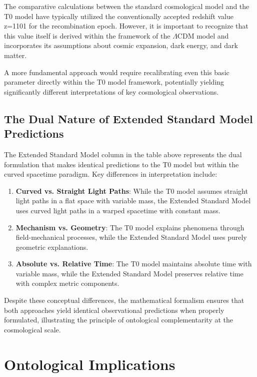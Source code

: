 \documentclass[12pt,a4paper]{article}
\begin{document}
	The comparative calculations between the standard cosmological model and the T0 model have typically utilized the conventionally accepted redshift value z=1101 for the recombination epoch. However, it is important to recognize that this value itself is derived within the framework of the $\Lambda$CDM model and incorporates its assumptions about cosmic expansion, dark energy, and dark matter.
	
	A more fundamental approach would require recalibrating even this basic parameter directly within the T0 model framework, potentially yielding significantly different interpretations of key cosmological observations.
	
	\subsection{The Dual Nature of Extended Standard Model Predictions}
	
	The Extended Standard Model column in the table above represents the dual formulation that makes identical predictions to the T0 model but within the curved spacetime paradigm. Key differences in interpretation include:
	
	\begin{enumerate}
		\item \textbf{Curved vs. Straight Light Paths}: While the T0 model assumes straight light paths in a flat space with variable mass, the Extended Standard Model uses curved light paths in a warped spacetime with constant mass.
		
		\item \textbf{Mechanism vs. Geometry}: The T0 model explains phenomena through field-mechanical processes, while the Extended Standard Model uses purely geometric explanations.
		
		\item \textbf{Absolute vs. Relative Time}: The T0 model maintains absolute time with variable mass, while the Extended Standard Model preserves relative time with complex metric components.
	\end{enumerate}
	
	Despite these conceptual differences, the mathematical formalism ensures that both approaches yield identical observational predictions when properly formulated, illustrating the principle of ontological complementarity at the cosmological scale.
	
	\section{Ontological Implications}
	
\end{document}
